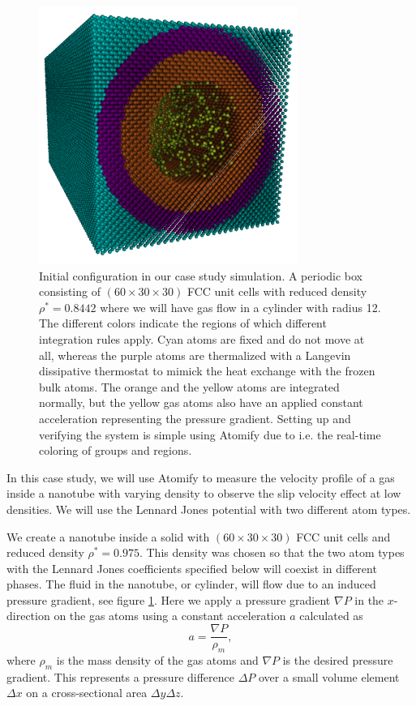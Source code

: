 \documentclass[12pt,a4paper,final]{iopart}
\begin{document}
\begin{figure}
	\centering
	\includegraphics[width=0.75\textwidth]{lj_flow/configuration.png}
	\caption{
		Initial configuration in our case study simulation.
		A periodic box consisting of $(60\times30\times30)$ FCC unit cells with reduced density $\rho^* = 0.8442$ where we will have gas flow in a cylinder with radius 12.
		The different colors indicate the regions of which different integration rules apply.
		Cyan atoms are fixed and do not move at all,
		whereas the purple atoms are thermalized with a Langevin\cite{schneider1978molecular} dissipative thermostat to mimick the heat exchange with the frozen bulk atoms.
		The orange and the yellow atoms are integrated normally, but the yellow gas atoms also have an applied constant acceleration representing the pressure gradient.
		Setting up and verifying the system is simple using Atomify due to i.e. the real-time coloring of groups and regions.
    }
	\label{fig:cylinder_simulation}
\end{figure}

In this case study, we will use Atomify to measure the velocity profile of a
gas inside a nanotube with varying density to observe
the slip velocity effect at low densities.
We will use the Lennard Jones potential with two different atom types.

We create a nanotube inside a solid with  $(60\times30\times30)$ FCC unit cells and reduced density $\rho^* = 0.975$.
This density was chosen so that the two atom types with the Lennard Jones coefficients specified below will coexist in different phases.
The fluid in the nanotube, or cylinder, will flow due to an induced pressure gradient, see figure \ref{fig:cylinder_simulation}.
Here we apply a pressure gradient $\nabla P$ in the $x$-direction on the gas atoms using a constant acceleration $a$ calculated as
\[
    a = \frac{\nabla P}{\rho_m},
\]
where $\rho_m$ is the mass density of the gas atoms and $\nabla P$ is the desired pressure gradient.
This represents a pressure difference $\Delta P$ over a small volume element $\Delta x$ on a cross-sectional area $\Delta y\Delta z$.
\end{document}
